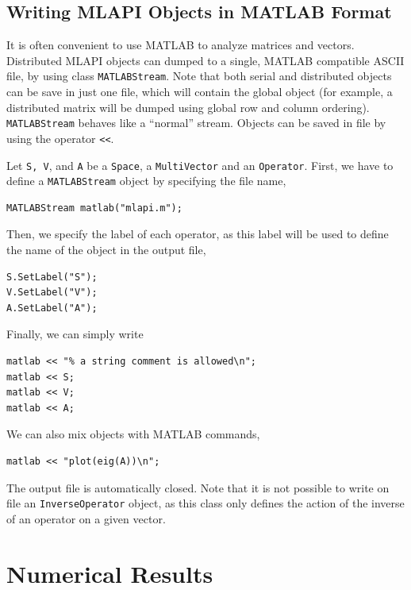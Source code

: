 \documentclass{article}[11pt]
\newcommand{\MLAPI}  {{\sc MLAPI }}
\begin{document}
\subsection{Writing \MLAPI Objects in MATLAB Format}
\label{sec:matlab}

It is often convenient to use MATLAB to analyze matrices and
vectors. Distributed \MLAPI objects can dumped to a single, MATLAB compatible
ASCII file, by using class {\tt MATLABStream}.
Note that both serial and distributed objects 
can be save in just one file, which will contain the global object
(for example, a distributed matrix will be dumped using global row and
 column ordering). {\tt MATLABStream} behaves like a ``normal'' 
stream.  Objects can be saved in file by using the operator \verb!<<!.

Let {\tt S, V}, and {\tt A} be a {\tt Space}, a {\tt MultiVector}
and an {\tt Operator}. First, we have to define a {\tt MATLABStream} object by specifying the
file name,
\begin{verbatim}
MATLABStream matlab("mlapi.m");
\end{verbatim}
Then, we specify the label of each operator, as this
label will be used to define the name of the object in the output file,
\begin{verbatim}
S.SetLabel("S");
V.SetLabel("V");
A.SetLabel("A");
\end{verbatim}
Finally, we can simply write
\begin{verbatim}
matlab << "% a string comment is allowed\n";
matlab << S;
matlab << V;
matlab << A;
\end{verbatim}
We can also mix objects with MATLAB commands,
\begin{verbatim}
matlab << "plot(eig(A))\n";
\end{verbatim}
The output file is automatically closed. Note that it is not possible to write
on file an {\tt InverseOperator} object, as this class only defines the
action of the inverse of an operator on a given vector.

\section{Numerical Results}
\label{sec:results}
\end{document}

